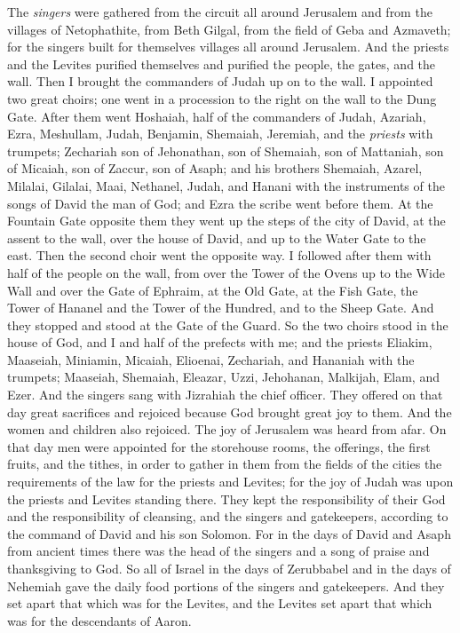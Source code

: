 \begin{biblechapter}
\verse The \textit{singers} were gathered from the circuit all around Jerusalem and from the villages of Netophathite,
\verse from Beth Gilgal, from the field of Geba and Azmaveth; for the singers built for themselves villages all around Jerusalem.
\verse And the priests and the Levites purified themselves and purified the people, the gates, and the wall.
\verse Then I brought the commanders of Judah up on to the wall. I appointed two great choirs; one went in a procession to the right on the wall to the Dung Gate.
\verse After them went Hoshaiah, half of the commanders of Judah,
\verse Azariah, Ezra, Meshullam,
\verse Judah, Benjamin, Shemaiah, Jeremiah,
\verse and the \textit{priests} with trumpets; Zechariah son of Jehonathan, son of Shemaiah, son of Mattaniah, son of Micaiah, son of Zaccur, son of Asaph;
\verse and his brothers Shemaiah, Azarel, Milalai, Gilalai, Maai, Nethanel, Judah, and Hanani with the instruments of the songs of David the man of God; and Ezra the scribe went before them.
\verse At the Fountain Gate opposite them they went up the steps of the city of David, at the assent to the wall, over the house of David, and up to the Water Gate to the east.
\verse Then the second choir went the opposite way. I followed after them with half of the people on the wall, from over the Tower of the Ovens up to the Wide Wall
\verse and over the Gate of Ephraim, at the Old Gate, at the Fish Gate, the Tower of Hananel and the Tower of the Hundred, and to the Sheep Gate. And they stopped and stood at the Gate of the Guard.
\verse So the two choirs stood in the house of God, and I and half of the prefects with me;
\verse and the priests Eliakim, Maaseiah, Miniamin, Micaiah, Elioenai, Zechariah, and Hananiah with the trumpets;
\verse Maaseiah, Shemaiah, Eleazar, Uzzi, Jehohanan, Malkijah, Elam, and Ezer. And the singers sang with Jizrahiah the chief officer.
\verse They offered on that day great sacrifices and rejoiced because God brought great joy to them. And the women and children also rejoiced. The joy of Jerusalem was heard from afar.
 On that day men were appointed for the storehouse rooms, the offerings, the first fruits, and the tithes, in order to gather in them from the fields of the cities the requirements of the law for the priests and Levites; for the joy of Judah was upon the priests and Levites standing there.
\verse They kept the responsibility of their God and the responsibility of cleansing, and the singers and gatekeepers, according to the command of David and his son Solomon.
\verse For in the days of David and Asaph from ancient times there was the head of the singers and a song of praise and thanksgiving to God.
\verse So all of Israel in the days of Zerubbabel and in the days of Nehemiah gave the daily food portions of the singers and gatekeepers. And they set apart that which was for the Levites, and the Levites set apart that which was for the descendants of Aaron.
\end{biblechapter}

